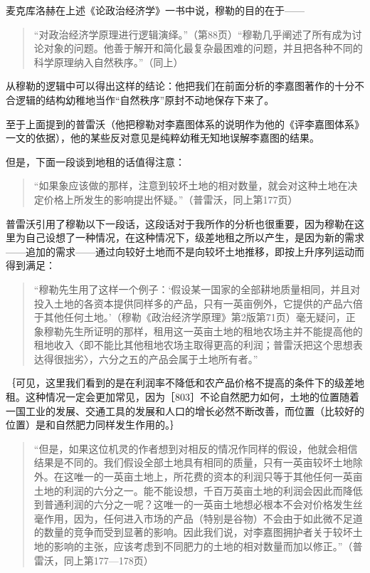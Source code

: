 麦克库洛赫在上述《论政治经济学》一书中说，穆勒的目的在于——

\begin{quote}{“对政治经济学原理进行逻辑演绎。”（第88页）“穆勒几乎阐述了所有成为讨论对象的问题。他善于解开和简化最复杂最困难的问题，并且把各种不同的科学原理纳入自然秩序。”（同上）}\end{quote}

从穆勒的逻辑中可以得出这样的结论：他把我们在前面分析的李嘉图著作的十分不合逻辑的结构幼稚地当作“自然秩序”原封不动地保存下来了。


至于上面提到的普雷沃（他把穆勒对李嘉图体系的说明作为他的《评李嘉图体系》一文的依据），他的某些反对意见是纯粹幼稚无知地误解李嘉图的结果。

但是，下面一段谈到地租的话值得注意：

\begin{quote}{“如果象应该做的那样，注意到较坏土地的相对数量，就会对这种土地在决定价格上所发生的影响提出怀疑。”（普雷沃，同上第177页）}\end{quote}

普雷沃引用了穆勒以下一段话，这段话对于我所作的分析也很重要，因为穆勒在这里为自己设想了一种情况，在这种情况下，级差地租之所以产生，是因为新的需求——追加的需求——通过向较好土地而不是向较坏土地推移，即按上升序列运动而得到满足：

\begin{quote}{“穆勒先生用了这样一个例子：‘假设某一国家的全部耕地质量相同，并且对投入土地的各资本提供同样多的产品，只有一英亩例外，它提供的产品六倍于其他任何土地。’（穆勒《政治经济学原理》第2版第71页）毫无疑问，正象穆勒先生所证明的那样，租用这一英亩土地的租地农场主并不能提高他的租地收入〈即不能比其他租地农场主取得更高的利润；普雷沃把这个思想表达得很拙劣〉，六分之五的产品会属于土地所有者。”}\end{quote}

｛可见，这里我们看到的是在利润率不降低和农产品价格不提高的条件下的级差地租。这种情况一定会更加常见，因为［803］不论自然肥力如何，土地的位置随着一国工业的发展、交通工具的发展和人口的增长必然不断改善，而位置（比较好的位置）是和自然肥力同样发生作用的。｝

\begin{quote}{“但是，如果这位机灵的作者想到对相反的情况作同样的假设，他就会相信结果是不同的。我们假设全部土地具有相同的质量，只有一英亩较坏土地除外。在这唯一的一英亩土地上，所花费的资本的利润只等于其他任何一英亩土地的利润的六分之一。能不能设想，千百万英亩土地的利润会因此而降低到普通利润的六分之一呢？这唯一的一英亩土地想必根本不会对价格发生丝毫作用，因为，任何进入市场的产品（特别是谷物）不会由于如此微不足道的数量的竞争而受到显著的影响。因此我们说，对李嘉图拥护者关于较坏土地的影响的主张，应该考虑到不同肥力的土地的相对数量而加以修正。”（普雷沃，同上第177—178页）}\end{quote}

